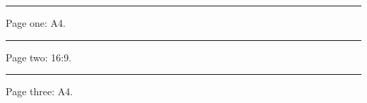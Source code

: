 \documentclass{article}
\begin{document}
\pdfpagewidth=595bp \pdfpageheight=842bp
\noindent\rule{200bp}{20bp}\par
Page one: A4.
\newpage
\pdfpagewidth=960bp \pdfpageheight=540bp
\noindent\rule{400bp}{20bp}\par
Page two: 16:9.
\newpage
\pdfpagewidth=595bp \pdfpageheight=842bp
\noindent\rule{300bp}{20bp}\par
Page three: A4.
\end{document}
